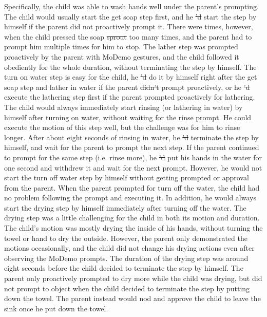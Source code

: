 \documentclass{ut-thesis}
\providecommand{\DIFaddtex}[1]{{\protect\color{blue}\uwave{#1}}} %
\providecommand{\DIFdeltex}[1]{{\protect\color{red}\sout{#1}}}                      %
\providecommand{\DIFaddbegin}{} %
\providecommand{\DIFaddend}{} %
\providecommand{\DIFdelbegin}{} %
\providecommand{\DIFdelend}{} %
\providecommand{\DIFadd}[1]{\texorpdfstring{\DIFaddtex{#1}}{#1}} %
\providecommand{\DIFdel}[1]{\texorpdfstring{\DIFdeltex{#1}}{}} %
\begin{document}
Specifically, the child was able to wash hands well under the parent's prompting.  The child would usually start the get soap step first, and he \DIFdelbegin \DIFdel{'d }\DIFdelend \DIFaddbegin \DIFadd{would }\DIFaddend start the step by himself if the parent did not proactively prompt it.  There were times, however, when the child pressed the soap \DIFdelbegin \DIFdel{sprout }\DIFdelend \DIFaddbegin \DIFadd{spout }\DIFaddend too many times, and the parent had to prompt him multiple times for him to stop.  The lather step was prompted proactively by the parent with MoDemo gestures, and the child followed it obediently for the whole duration, without terminating the step by himself.  The turn on water step is easy for the child, he \DIFdelbegin \DIFdel{'d }\DIFdelend \DIFaddbegin \DIFadd{would }\DIFaddend do it by himself right after the get soap step and lather in water if the parent \DIFdelbegin \DIFdel{didn't }\DIFdelend \DIFaddbegin \DIFadd{did not }\DIFaddend prompt proactively, or he \DIFdelbegin \DIFdel{'d }\DIFdelend \DIFaddbegin \DIFadd{would }\DIFaddend execute the lathering step first if the parent prompted proactively for lathering.  The child would always immediately start rinsing (or lathering in water) by himself after turning on water, without waiting for the rinse prompt.  He could execute the motion of this step well, but the challenge was for him to rinse longer.  After about eight seconds of rinsing in water, he \DIFdelbegin \DIFdel{'d }\DIFdelend \DIFaddbegin \DIFadd{would }\DIFaddend terminate the step by himself, and wait for the parent to prompt the next step.  If the parent continued to prompt for the same step (i.e. rinse more), he \DIFdelbegin \DIFdel{'d }\DIFdelend \DIFaddbegin \DIFadd{would }\DIFaddend put his hands in the water for one second and withdrew it and wait for the next prompt.  However, he would not start the turn off water step by himself without getting prompted or approval from the parent.  When the parent prompted for turn off the water, the child had no problem following the prompt and executing it.  In addition, he would always start the drying step by himself immediately after turning off the water.  The drying step was a little challenging for the child in both its motion and duration.  The child's motion was mostly drying the inside of his hands, without turning the towel or hand to dry the outside.  However, the parent only demonstrated the motions occasionally, and the child did not change his drying actions even after observing the MoDemo prompts.  The duration of the drying step was around eight seconds before the child decided to terminate the step by himself.  The parent only proactively prompted to dry more while the child was drying, but did not prompt to object when the child decided to terminate the step by putting down the towel.  The parent instead would nod and approve the child to leave the sink once he put down the towel.
\end{document}

